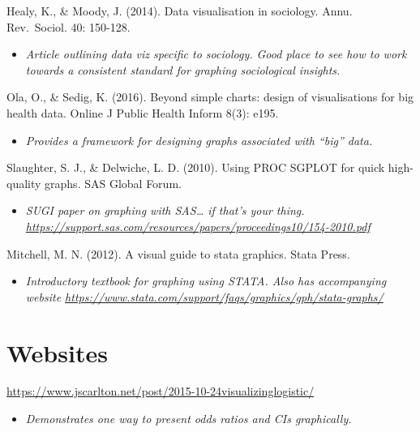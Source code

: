 \documentclass[
]{book}
\providecommand{\tightlist}{%
  \setlength{\itemsep}{0pt}\setlength{\parskip}{0pt}}
\begin{document}
Healy, K., \& Moody, J. (2014). Data visualisation in sociology. Annu. Rev.~Sociol. 40: 150-128.

\begin{itemize}
\tightlist
\item
  \emph{Article outlining data viz specific to sociology. Good place to see how to work towards a consistent standard for graphing sociological insights.}
\end{itemize}

Ola, O., \& Sedig, K. (2016). Beyond simple charts: design of visualisations for big health data. Online J Public Health Inform 8(3): e195.

\begin{itemize}
\tightlist
\item
  \emph{Provides a framework for designing graphs associated with ``big'' data.}
\end{itemize}

Slaughter, S. J., \& Delwiche, L. D. (2010). Using PROC SGPLOT for quick high-quality graphs. SAS Global Forum.

\begin{itemize}
\tightlist
\item
  \emph{SUGI paper on graphing with SAS\ldots{} if that's your thing. \url{https://support.sas.com/resources/papers/proceedings10/154-2010.pdf}}
\end{itemize}

Mitchell, M. N. (2012). A visual guide to stata graphics. Stata Press.

\begin{itemize}
\tightlist
\item
  \emph{Introductory textbook for graphing using STATA. Also has accompanying website \url{https://www.stata.com/support/faqs/graphics/gph/stata-graphs/}}
\end{itemize}

\hypertarget{websites-1}{%
\section{Websites}\label{websites-1}}

\url{https://www.jscarlton.net/post/2015-10-24visualizinglogistic/}

\begin{itemize}
\tightlist
\item
  \emph{Demonstrates one way to present odds ratios and CIs graphically.}
\end{itemize}
\end{document}
